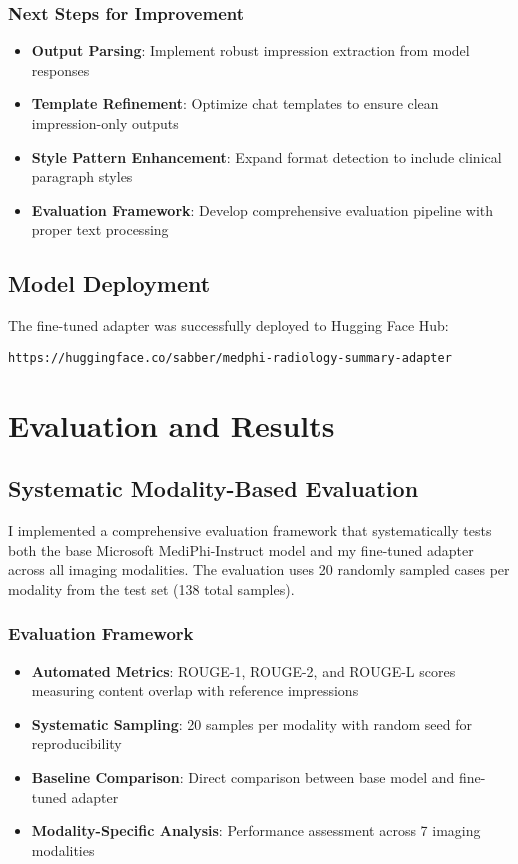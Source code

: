 \documentclass[11pt,letterpaper]{article}
\begin{document}
\subsubsection{Next Steps for Improvement}
\begin{itemize}
    \item \textbf{Output Parsing}: Implement robust impression extraction from model responses
    \item \textbf{Template Refinement}: Optimize chat templates to ensure clean impression-only outputs
    \item \textbf{Style Pattern Enhancement}: Expand format detection to include clinical paragraph styles
    \item \textbf{Evaluation Framework}: Develop comprehensive evaluation pipeline with proper text processing
\end{itemize}

\subsection{Model Deployment}
The fine-tuned adapter was successfully deployed to Hugging Face Hub:
\begin{center}
\texttt{https://huggingface.co/sabber/medphi-radiology-summary-adapter}
\end{center}

\section{Evaluation and Results}

\subsection{Systematic Modality-Based Evaluation}
I implemented a comprehensive evaluation framework that systematically tests both the base Microsoft MediPhi-Instruct model and my fine-tuned adapter across all imaging modalities. The evaluation uses 20 randomly sampled cases per modality from the test set (138 total samples).

\subsubsection{Evaluation Framework}
\begin{itemize}
    \item \textbf{Automated Metrics}: ROUGE-1, ROUGE-2, and ROUGE-L scores measuring content overlap with reference impressions
    \item \textbf{Systematic Sampling}: 20 samples per modality with random seed for reproducibility
    \item \textbf{Baseline Comparison}: Direct comparison between base model and fine-tuned adapter
    \item \textbf{Modality-Specific Analysis}: Performance assessment across 7 imaging modalities
\end{itemize}
\end{document}

